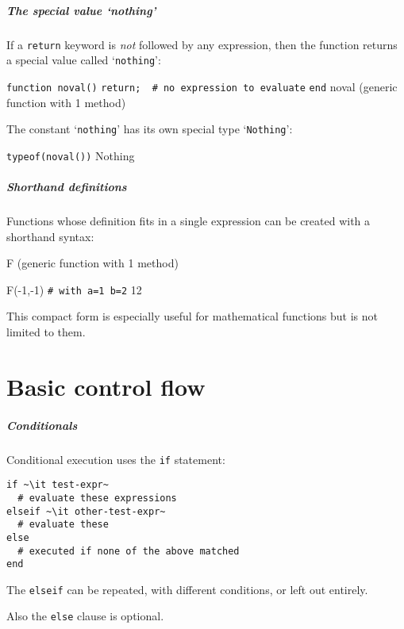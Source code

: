 \documentclass[english,serif,mathserif,xcolor=pdftex,dvipsnames,table]{beamer}
\begin{document}
\begin{frame}[fragile]
  \frametitle{The special value `nothing'}
  If a \texttt{return} keyword is \emph{not} followed by any
  expression, then the function returns a special value called
  `\texttt{nothing}':
\begin{semiverbatim}
\julia \lstinline|function noval()|
       \lstinline|return;  # no expression to evaluate|
       \lstinline|end|
noval (generic function with 1 method)
\end{semiverbatim}

  \+ The constant `\texttt{nothing}' has its own special type `\texttt{Nothing}':
\begin{semiverbatim}
\julia \lstinline|typeof(noval())|
Nothing
\end{semiverbatim}
\end{frame}


\begin{frame}[fragile]
  \frametitle{Shorthand definitions}
  Functions whose definition fits in a single expression can be created with
  a shorthand syntax:
\begin{semiverbatim}
\julia {}
F (generic function with 1 method)

\julia F(-1,-1)  \lstinline|# with a=1 b=2|
12
\end{semiverbatim}

  \+ This compact form is especially useful for mathematical functions
  but is not limited to them.
\end{frame}


\part{Basic control flow}
\begin{frame}[fragile]
  \frametitle{Conditionals}
  Conditional execution uses the \texttt{if} statement:
\begin{lstlisting}
if ~\it test-expr~
  # evaluate these expressions
elseif ~\it other-test-expr~
  # evaluate these
else
  # executed if none of the above matched
end
\end{lstlisting}

  \+The \texttt{elseif} can be repeated, with different conditions, or
  left out entirely.

  \+
  Also the \texttt{else} clause is optional.
\end{frame}
\end{document}
